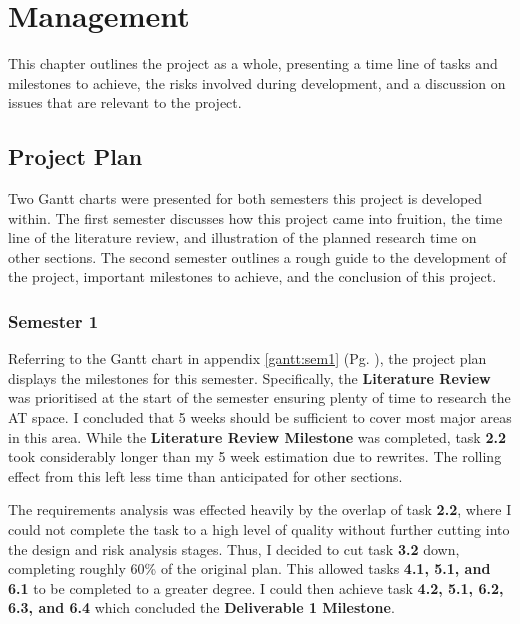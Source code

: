 %
\chapter{Management}
\label{sec:management}

This chapter outlines the project as a whole, presenting a time line of tasks and milestones to achieve, the risks involved during development, and a discussion on issues that are relevant to the project.



\section{Project Plan}
\label{sec:management:pp}

\noindent Two Gantt charts were presented for both semesters this project is developed within. The first semester discusses how this project came into fruition, the time line of the literature review, and illustration of the planned research time on other sections. The second semester outlines a rough guide to the development of the project, important milestones to achieve, and the conclusion of this project.

\subsection{Semester 1}
\label{sec:management:pp:sem1}

\noindent Referring to the Gantt chart in appendix \ref{gantt:sem1} (Pg. \pageref{gantt:sem1}), the project plan displays the milestones for this semester. Specifically, the \textbf{Literature Review} was prioritised at the start of the semester ensuring plenty of time to research the AT space. I concluded that 5 weeks should be sufficient to cover most major areas in this area. While the \textbf{Literature Review Milestone} was completed, task \textbf{2.2} took considerably longer than my 5 week estimation due to rewrites. The rolling effect from this left less time than anticipated for other sections.

The requirements analysis was effected heavily by the overlap of task \textbf{2.2}, where I could not complete the task to a high level of quality without further cutting into the design and risk analysis stages. Thus, I decided to cut task \textbf{3.2} down, completing roughly 60\% of the original plan. This allowed tasks \textbf{4.1, 5.1, and 6.1} to be completed to a greater degree. I could then achieve task \textbf{4.2, 5.1, 6.2, 6.3, and 6.4} which concluded the \textbf{Deliverable 1 Milestone}. 



